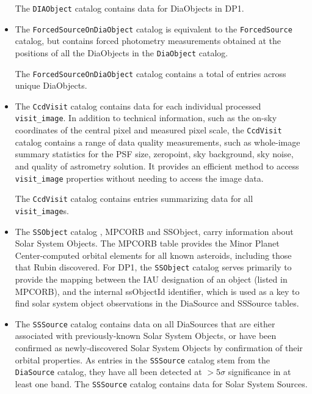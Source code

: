 \begin{itemize}
The \texttt{DIAObject} catalog contains data for \ndiaobjects DiaObjects in \gls{DP1}.


\item The \texttt{ForcedSourceOnDiaObject} catalog \citep{10.71929/rubin/2570321} is equivalent to the \texttt{ForcedSource} catalog, but contains \gls{forced photometry} measurements obtained at the positions of all the DiaObjects in the \texttt{DiaObject} catalog.

The \texttt{ForcedSourceOnDiaObject} catalog  contains a total of \ndiaforcedsources entries across \ndiaforcedobjects unique DiaObjects.


\item The \texttt{CcdVisit} catalog \citep{10.71929/rubin/2570331} contains data for each individual processed \texttt{visit\_image}.
In addition to technical information, such as the on-sky coordinates of the central pixel and measured pixel scale, the \texttt{CcdVisit} catalog contains a range of data quality measurements, such as whole-image summary statistics for the \gls{PSF} size, zeropoint, sky \gls{background}, sky noise, and quality of \gls{astrometry} solution.
It provides an efficient method to access  \texttt{visit\_image} properties without needing to access the image data.

The \texttt{CcdVisit} catalog contains entries summarizing data for all \nvisitdetectorsummaries \texttt{visit\_image}s.

\item The \texttt{SSObject} catalog \citep{10.71929/rubin/2570335}, \gls{MPCORB} and SSObject, carry information about Solar System Objects. 
The \gls{MPCORB} table provides the Minor Planet \gls{Center}-computed orbital elements for all known asteroids, including those that Rubin discovered. 
For DP1, the  \texttt{SSObject} catalog serves primarily to provide the mapping between the \gls{IAU} designation of an object (listed in \gls{MPCORB}), and the internal ssObjectId identifier, which is used as a key to find solar system object observations in the DiaSource and SSSource tables.
\item The \texttt{SSSource} catalog \citep{10.71929/rubin/2570333} contains data on all DiaSources that are either associated with previously-known Solar System Objects, or have been confirmed as newly-discovered Solar System Objects by confirmation of their orbital properties. 
As entries in the \texttt{SSSource} catalog stem from the \texttt{DiaSource} catalog, they have all been detected at $>5\sigma$ significance in at least one band.
The \texttt{SSSource} catalog contains data for \nsolarsystemsources Solar System Sources.


\end{itemize}
